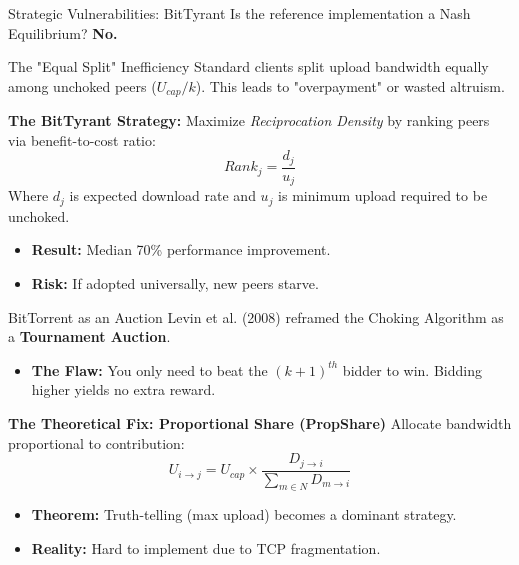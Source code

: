 \documentclass[aspectratio=169]{beamer}
\begin{document}
\begin{frame}{Strategic Vulnerabilities: BitTyrant}
    Is the reference implementation a Nash Equilibrium? \textbf{No.}
    
    \begin{alertblock}{The "Equal Split" Inefficiency }
        Standard clients split upload bandwidth equally among unchoked peers ($U_{cap}/k$). This leads to "overpayment" or wasted altruism.
    \end{alertblock}

    \textbf{The BitTyrant Strategy:}
    Maximize \textit{Reciprocation Density} by ranking peers via benefit-to-cost ratio:
    \begin{equation}
        Rank_{j} = \frac{d_{j}}{u_{j}}
    \end{equation}
    Where $d_j$ is expected download rate and $u_j$ is minimum upload required to be unchoked.
    
    \begin{itemize}
        \item \textbf{Result:} Median 70\% performance improvement.
        \item \textbf{Risk:} If adopted universally, new peers starve.
    \end{itemize}
\end{frame}

\begin{frame}{BitTorrent as an Auction}
    Levin et al. (2008) reframed the Choking Algorithm as a \textbf{Tournament Auction}.
    
    \begin{itemize}
        \item \textbf{The Flaw:} You only need to beat the $(k+1)^{th}$ bidder to win. Bidding higher yields no extra reward.
    \end{itemize}

    \vspace{0.5cm}
    \textbf{The Theoretical Fix: Proportional Share (PropShare)}
    Allocate bandwidth proportional to contribution:
    \begin{equation}
        U_{i\rightarrow j} = U_{cap} \times \frac{D_{j\rightarrow i}}{\sum_{m\in N} D_{m\rightarrow i}}
    \end{equation}
    
    \begin{itemize}
        \item \textbf{Theorem:} Truth-telling (max upload) becomes a dominant strategy.
        \item \textbf{Reality:} Hard to implement due to TCP fragmentation.
    \end{itemize}
\end{frame}
\end{document}
